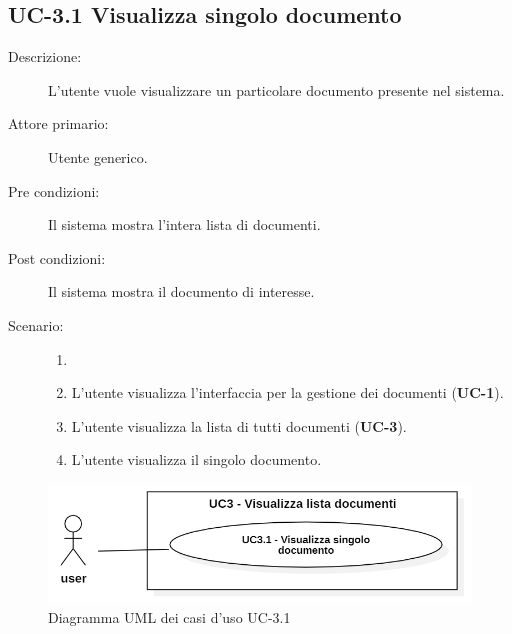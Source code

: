 \subsection{UC-3.1 Visualizza singolo documento}
\begin{description}
    \item[Descrizione:] L'utente vuole visualizzare un particolare documento presente nel sistema.
    \item[Attore primario:] Utente generico.
    \item[Pre condizioni:] Il sistema mostra l’intera lista di documenti.
    \item[Post condizioni:] Il sistema mostra il documento di interesse.
    \item[Scenario:]
    \begin{enumerate}
        \item[] 
        \item L’utente visualizza l'interfaccia per la gestione dei documenti (\textbf{UC-1}).
        \item L’utente visualizza la lista di tutti documenti (\textbf{UC-3}).
        \item L'utente visualizza il singolo documento.
    \end{enumerate} 
\end{description}

\begin{figure}[H]
    \centering
    \includegraphics[width=0.8\linewidth]{UC3.1.PNG}
    \caption{Diagramma UML dei casi d'uso UC-3.1}
    \label{fig:UC3.1}
\end{figure}

